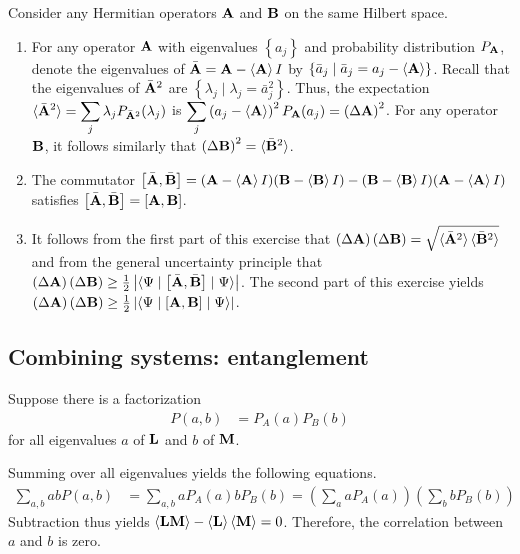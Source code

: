 \begin{answer}[Uncertainty]
	Consider any Hermitian operators $\mathbf{A}$ and $\mathbf{B}$ on the same Hilbert space.
	\begin{enumerate}
		\item For any operator $\mathbf{A}$ with eigenvalues $\left\{a_j\right\}$ and probability distribution $P_{\mathbf{A}}$, denote the eigenvalues of $\bar{\mathbf{A}} = \mathbf{A} - \braket{\mathbf{A}} I$ by $\left\{\bar{a}_j \mid \bar{a}_j = a_j - \braket{\mathbf{A}} \right\}$.
		      Recall that the eigenvalues of $\bar{\mathbf{A}}^2$ are $\left\{\lambda_j \mid \lambda_j = \bar{a}_j^2\right\}$.
		      Thus, the expectation $\displaystyle \braket{\bar{\mathbf{A}}^2} = \sum_{j} \lambda_j P_{\bar{\mathbf{A}}^2}\!\left(\lambda_j\right)$ is $\displaystyle \sum_j \left(a_j - \braket{\mathbf{A}}\right)^2 P_{\mathbf{A}}\!\left(a_j\right) = \left(\Delta \mathbf{A}\right)^2$.
		      For any operator $\mathbf{B}$, it follows similarly that $\left(\Delta \mathbf{B}\right)^2 = \braket{\bar{\mathbf{B}}^2}$.
		\item The commutator $\left[\bar{\mathbf{A}}, \bar{\mathbf{B}}\right] = (\mathbf{A} - \braket{\mathbf{A}} I) (\mathbf{B} - \braket{\mathbf{B}} I) - (\mathbf{B} - \braket{\mathbf{B}} I) (\mathbf{A} - \braket{\mathbf{A}} I)$ satisfies $\left[\bar{\mathbf{A}}, \bar{\mathbf{B}}\right] = \left[\mathbf{A}, \mathbf{B}\right]$.
		\item It follows from the first part of this exercise that $\left(\Delta \mathbf{A}\right) \left(\Delta \mathbf{B}\right) = \sqrt{\braket{\bar{\mathbf{A}}^2} \braket{\bar{\mathbf{B}}^2}}$ and from the general uncertainty principle that $\left(\Delta \mathbf{A}\right) \left(\Delta \mathbf{B}\right) \geq \frac{1}{2} \left|\braket{\Psi \mid \left[\bar{\mathbf{A}}, \bar{\mathbf{B}}\right] \mid \Psi}\right|$.
		      The second part of this exercise yields $\left(\Delta \mathbf{A}\right) \left(\Delta \mathbf{B}\right) \geq \frac{1}{2} \left|\braket{\Psi \mid \left[\mathbf{A}, \mathbf{B}\right] \mid \Psi}\right|$.
	\end{enumerate}
\end{answer}

\subsection{Combining systems: entanglement}

\begin{answer}[Factorization]
	Suppose there is a factorization
	\begin{align}
		P(a, b) & = P_A(a) P_B(b)
	\end{align}
	for all eigenvalues $a$ of $\mathbf{L}$ and $b$ of $\mathbf{M}$.

	Summing over all eigenvalues yields the following equations.
	\begin{align*}
		\sum_{a, b} a b P(a, b) & = \sum_{a, b} a P_A(a) b P_B(b) = \left(\sum_a a P_A(a)\right) \left(\sum_b b P_B(b)\right)
	\end{align*}
	Subtraction thus yields $\braket{\mathbf{L} \mathbf{M}} - \braket{\mathbf{L}} \braket{\mathbf{M}} = 0$.
	Therefore, the correlation between $a$ and $b$ is zero.
\end{answer}

